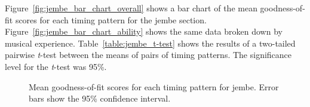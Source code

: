 \documentclass[12pt,twoside,openright]{report}
\begin{document}
Figure~\ref{fig:jembe_bar_chart_overall} shows a bar chart of the mean goodness-of-fit scores for each timing
pattern for the jembe section. Figure~\ref{fig:jembe_bar_chart_ability} shows the same data broken down by
musical experience. Table~\ref{table:jembe_t-test} shows the results of a two-tailed pairwise \textit{t}-test between the means of pairs of timing patterns. The significance level for the \textit{t}-test was 95\%.

\begin{figure}[ht]
    \centering
    \caption{Mean goodness-of-fit scores for each timing pattern for jembe. Error bars show the 95\% confidence interval.}
    \label{fig:jembe_bar_charts}
\end{figure}
\end{document}
